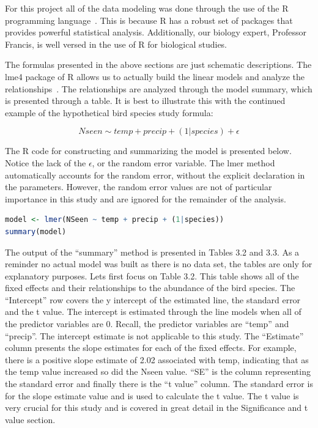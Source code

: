 \lstset{style=mystyle}

For this project all of the data modeling was done through the use of the R programming language~\cite{RManual}. This is because R has a robust set of packages that provides powerful statistical analysis. Additionally, our biology expert, Professor Francis, is well versed in the use of R for biological studies.

The formulas presented in the above sections are just schematic descriptions. The lme4 package of R allows us to actually build the linear models and analyze the relationships~\cite{lme4Usage}. The relationships are analyzed through the model summary, which is presented through a table. It is best to illustrate this with the continued example of the hypothetical bird species study formula:

\[ Nseen \sim temp + precip + (1|species) + \epsilon\]

The R code for constructing and summarizing the model is presented below. Notice the lack of the $\epsilon$, or the random error variable. The lmer method automatically accounts for the random error, without the explicit declaration in the parameters. However, the random error values are not of particular importance in this study and are ignored for the remainder of the analysis. 

\begin{lstlisting}[language=R]
model <- lmer(NSeen ~ temp + precip + (1|species))
summary(model)
\end{lstlisting}

The output of the ``summary'' method is presented in Tables 3.2 and 3.3. As a reminder no actual model was built as there is no data set, the tables are only for explanatory purposes. Lets first focus on Table 3.2. This table shows all of the fixed effects and their relationships to the abundance of the bird species. The ``Intercept'' row covers the y intercept of the estimated line, the standard error and the t value. The intercept is estimated through the line models when all of the predictor variables are 0. Recall, the predictor variables are ``temp'' and ``precip''. The intercept estimate is not applicable to this study. The ``Estimate'' column presents the slope estimates for each of the fixed effects. For example, there is a positive slope estimate of 2.02 associated with temp, indicating that as the temp value increased so did the Nseen value. ``SE'' is the column representing the standard error and finally there is the ``t value'' column. The standard error is for the slope estimate value and is used to calculate the t value. The t value is very crucial for this study and is covered in great detail in the Significance and t value section.

